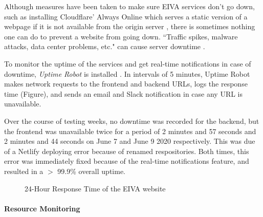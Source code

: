 \documentclass{article}
\begin{document}
Although measures have been taken to make sure EIVA services don't go down, such as installing Cloudflare' Always Online which serves a static version of a webpage if it is not available from the origin server \cite{noauthor_keep_nodate}, there is sometimes nothing one can do to prevent a website from going down. ``Traffic spikes, malware attacks, data center problems, etc." can cause server downtime \cite{noauthor_what_2018}.

To monitor the uptime of the services and get real-time notifications in case of downtime, \emph{Uptime Robot} is installed \cite{noauthor_about_nodate}. In intervals of 5 minutes, Uptime Robot makes network requests to the frontend and backend URLs, logs the response time (Figure), and sends an email and Slack notification in case any URL is unavailable.

Over the course of testing weeks, no downtime was recorded for the backend, but the frontend was unavailable twice for a period of 2 minutes and 57 seconds and 2 minutes and 44 seconds on June 7 and June 9 2020 respectively. This was due of a Netlify deploying error because of renamed respositories. Both times, this error was immediately fixed because of the real-time notifications feature, and resulted in a $>$ 99.9\% overall uptime.

\begin{figure}
	\centering
	\caption{24-Hour Response Time of the EIVA website}
\end{figure}

\paragraph{Resource Monitoring}
\end{document}
